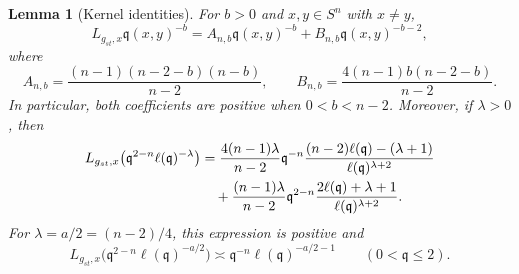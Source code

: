 \documentclass[12pt,oneside,a4paper]{article}
\theoremstyle{mytheorem}
\newtheorem{lemma}[definition]{Lemma}
\theoremstyle{remark}
\theoremstyle{definition}
\begin{document}
\begin{lemma}[Kernel identities]\label{lem:kernels}
For $b>0$ and $x,y\in S^n$ with $x\ne y$,
\begin{equation}\label{eq:power}
 L_{g_{st},x}\mathfrak q(x,y)^{-b}
 =A_{n,b}\mathfrak q(x,y)^{-b}+B_{n,b}\mathfrak q(x,y)^{-b-2},
\end{equation}
where
\[
 A_{n,b}=\frac{(n-1)(n-2-b)(n-b)}{n-2},
 \qquad
 B_{n,b}=\frac{4(n-1)b(n-2-b)}{n-2}.
\]
In particular, both coefficients are positive when $0<b<n-2$.
Moreover, if $\lambda>0$, then
\begin{align}
 L_{g_{st},x}\bigl(\mathfrak q^{2-n}\ell(\mathfrak q)^{-\lambda}\bigr)
 &=\frac{4(n-1)\lambda}{n-2}\mathfrak q^{-n}
   \frac{(n-2)\ell(\mathfrak q)-(\lambda+1)}{\ell(\mathfrak q)^{\lambda+2}}
 \notag\\
 &\quad+\frac{(n-1)\lambda}{n-2}\mathfrak q^{2-n}
   \frac{2\ell(\mathfrak q)+\lambda+1}{\ell(\mathfrak q)^{\lambda+2}}.
 \label{eq:critical}
\end{align}
For $\lambda=a/2=(n-2)/4$, this expression is positive and
\begin{equation}\label{eq:critical-comparison}
 L_{g_{st},x}\bigl(\mathfrak q^{2-n}\ell(\mathfrak q)^{-a/2}\bigr)
 \asymp \mathfrak q^{-n}\ell(\mathfrak q)^{-a/2-1}
 \qquad(0<\mathfrak q\le2).
\end{equation}
\end{lemma}
\end{document}
